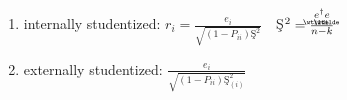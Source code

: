 \documentclass{article}
\begin{document}
\begin{enumerate}
\item internally studentized: $r_{i}=\frac{e_{i}}{\sqrt{\left(
1-P_{ii}\right) \text{\c{S}}^{2}}}\quad $\c{S}$^{2}=\frac{%
\underaccent{\wtilde}{e}%
^{\dagger }%
\underaccent{\wtilde}{e}%
}{n-k}$

\item externally studentized: $\frac{e_{i}}{\sqrt{\left( 1-P_{ii}\right) 
\text{\c{S}}_{\left( i\right) }^{2}}}$
\end{enumerate}
\end{document}
